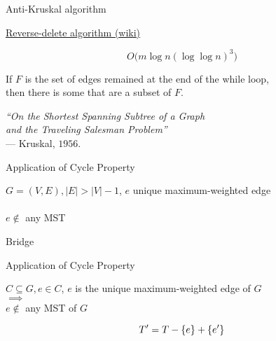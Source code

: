 \begin{frame}{}
  \begin{exampleblock}{Anti-Kruskal algorithm }
    \centerline{\href{https://en.wikipedia.org/wiki/Reverse-delete_algorithm}{Reverse-delete algorithm (wiki)}}
  \end{exampleblock}

  \pause
  \[
    O\Big(m \log n (\log \log n)^3\Big)
  \]

  \pause
  \begin{theorem}
    \begin{center}
      If $F$ is the set of edges remained at the end of the while loop, \\
      then there is some  that are a subset of $F$.
    \end{center}
  \end{theorem}

  \pause
  \vspace{0.50cm}
  \begin{center}
    {\it ``On the Shortest Spanning Subtree of a Graph \\
    and the Traveling Salesman Problem''} \\
    \hfill --- Kruskal, $1956$.
  \end{center}
\end{frame}

\begin{frame}{}
  \begin{exampleblock}{Application of Cycle Property }
    \begin{center}
      $G = (V, E), |E| > |V| - 1$, $e$ unique maximum-weighted edge \\[6pt]
       \\[6pt]
      $e \notin$ any MST
    \end{center}
  \end{exampleblock}

  \pause
  \vspace{0.60cm}
  \centerline{\large Bridge}
\end{frame}

\begin{frame}{}
  \begin{exampleblock}{Application of Cycle Property }
    \begin{center}
      $C \subseteq G, e \in C$, $e$ is the unique maximum-weighted edge of $G$ \\[6pt]
      $\implies$ \\[6pt]
      $e \notin$ any MST of $G$
    \end{center}
  \end{exampleblock}

  \pause
  \vspace{0.50cm}
  \centerline{}
  \[
    T' = T - \{e\} + \{e'\}
  \]
\end{frame}

